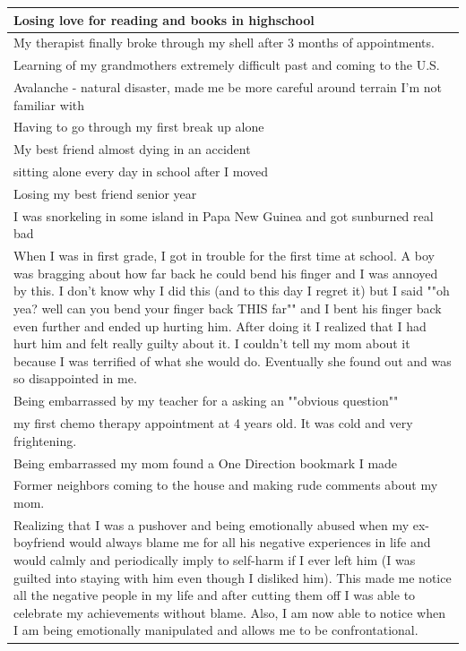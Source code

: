 \documentclass[
  .7em,
  letterpaper,
  DIV=11,
  numbers=noendperiod]{scrartcl}
\begin{document}
\begin{table}
\begin{tabular}{l}
\hline
Losing love for reading and books in highschool\\
\hline
My therapist finally broke through my shell after 3 months of appointments.\\
\hline
Learning of my grandmothers extremely difficult past and coming to the U.S.\\
\hline
Avalanche - natural disaster, made me be more careful around terrain I'm not familiar with\\
\hline
Having to go through my first break up alone\\
\hline
My best friend almost dying in an accident\\
\hline
sitting alone every day in school after I moved\\
\hline
Losing my best friend senior year\\
\hline
I was snorkeling in some island in Papa New Guinea and got sunburned real bad\\
\hline
When I was in first grade, I got in trouble for the first time at school. A boy was bragging about how far back he could bend his finger and I was annoyed by this. I don't know why I did this (and to this day I regret it) but I said ""oh yea? well can you bend your finger back THIS far"" and I bent his finger back even further and ended up hurting him. After doing it I realized that I had hurt him and felt really guilty about it. I couldn't tell my mom about it because I was terrified of what she would do. Eventually she found out and was so disappointed in me.\\
\hline
Being embarrassed by my teacher for a asking an ""obvious question""\\
\hline
my first chemo therapy appointment at 4 years old. It was cold and very frightening.\\
\hline
Being embarrassed my mom found a One Direction bookmark I made\\
\hline
Former neighbors coming to the house and making rude comments about my mom.\\
\hline
Realizing that I was a pushover and being emotionally abused when my ex-boyfriend would always blame me for all his negative experiences in life and would calmly and periodically imply to self-harm if I ever left him (I was guilted into staying with him even though I disliked him). This made me notice all the negative people in my life and after cutting them off I was able to celebrate my achievements without blame. Also, I am now able to notice when I am being emotionally manipulated and allows me to be confrontational.\\

\end{tabular}
\end{table}
\end{document}
